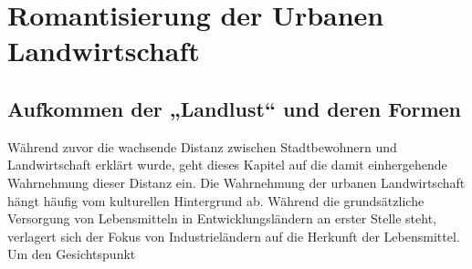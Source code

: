 \documentclass{scrartcl}
\begin{document}
\section{Romantisierung der Urbanen Landwirtschaft}

\subsection{Aufkommen der „Landlust“ und deren Formen}

Während zuvor die wachsende Distanz zwischen Stadtbewohnern und Landwirtschaft erklärt wurde, geht dieses Kapitel auf die damit einhergehende Wahrnehmung dieser Distanz ein. Die Wahrnehmung der urbanen Landwirtschaft hängt häufig vom kulturellen Hintergrund ab. Während die grundsätzliche Versorgung von Lebensmitteln in Entwicklungsländern an erster Stelle steht, verlagert sich der Fokus von Industrieländern auf die Herkunft der Lebensmittel. Um den Gesichtspunkt \\
\\
\end{document}

